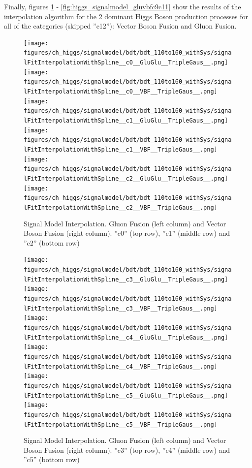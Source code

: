 Finally, figures \ref{fig:higgs_signalmodel_gluvbfc0c2} - \ref{fig:higgs_signalmodel_gluvbfc9c11} show the results of the interpolation algorithm for the 2 dominant Higgs Boson production processes for all of the categories (skipped ''c12''): Vector Boson Fusion and Gluon Fusion.
\begin{figure}[htbp]
  \centering
  \texttt{[image: figures/ch\_higgs/signalmodel/bdt/bdt\_110to160\_withSys/signalFitInterpolationWithSpline\_\_c0\_\_GluGlu\_\_TripleGaus\_\_.png]}
  \texttt{[image: figures/ch\_higgs/signalmodel/bdt/bdt\_110to160\_withSys/signalFitInterpolationWithSpline\_\_c0\_\_VBF\_\_TripleGaus\_\_.png]}\\
  \texttt{[image: figures/ch\_higgs/signalmodel/bdt/bdt\_110to160\_withSys/signalFitInterpolationWithSpline\_\_c1\_\_GluGlu\_\_TripleGaus\_\_.png]}
  \texttt{[image: figures/ch\_higgs/signalmodel/bdt/bdt\_110to160\_withSys/signalFitInterpolationWithSpline\_\_c1\_\_VBF\_\_TripleGaus\_\_.png]}\\
  \texttt{[image: figures/ch\_higgs/signalmodel/bdt/bdt\_110to160\_withSys/signalFitInterpolationWithSpline\_\_c2\_\_GluGlu\_\_TripleGaus\_\_.png]}
  \texttt{[image: figures/ch\_higgs/signalmodel/bdt/bdt\_110to160\_withSys/signalFitInterpolationWithSpline\_\_c2\_\_VBF\_\_TripleGaus\_\_.png]}
  \caption{Signal Model Interpolation. Gluon Fusion (left column) and Vector Boson Fusion (right column). ''c0'' (top row), ''c1'' (middle row) and ''c2'' (bottom row)}
  \label{fig:higgs_signalmodel_gluvbfc0c2}
\end{figure}
\begin{figure}[htbp]
  \centering
  \texttt{[image: figures/ch\_higgs/signalmodel/bdt/bdt\_110to160\_withSys/signalFitInterpolationWithSpline\_\_c3\_\_GluGlu\_\_TripleGaus\_\_.png]}
  \texttt{[image: figures/ch\_higgs/signalmodel/bdt/bdt\_110to160\_withSys/signalFitInterpolationWithSpline\_\_c3\_\_VBF\_\_TripleGaus\_\_.png]}\\
  \texttt{[image: figures/ch\_higgs/signalmodel/bdt/bdt\_110to160\_withSys/signalFitInterpolationWithSpline\_\_c4\_\_GluGlu\_\_TripleGaus\_\_.png]}
  \texttt{[image: figures/ch\_higgs/signalmodel/bdt/bdt\_110to160\_withSys/signalFitInterpolationWithSpline\_\_c4\_\_VBF\_\_TripleGaus\_\_.png]}\\
  \texttt{[image: figures/ch\_higgs/signalmodel/bdt/bdt\_110to160\_withSys/signalFitInterpolationWithSpline\_\_c5\_\_GluGlu\_\_TripleGaus\_\_.png]}
  \texttt{[image: figures/ch\_higgs/signalmodel/bdt/bdt\_110to160\_withSys/signalFitInterpolationWithSpline\_\_c5\_\_VBF\_\_TripleGaus\_\_.png]}
  \caption{Signal Model Interpolation. Gluon Fusion (left column) and Vector Boson Fusion (right column). ''c3'' (top row), ''c4'' (middle row) and ''c5'' (bottom row)}
  \label{fig:higgs_signalmodel_gluvbfc3c5}
\end{figure}
